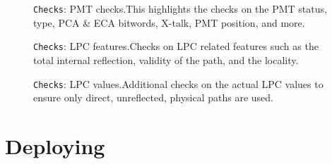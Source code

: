 \documentclass[12pt]{article}
\begin{document}
\begin{figure}
\centering
\noindent{}
  \caption{\centering \texttt{Checks}: PMT checks.\hspace{\textwidth}This highlights the checks on the PMT status, type, PCA \& ECA bitwords, X-talk, PMT position, and more.}
  \label{fig:ch2}
\end{figure}

\begin{figure}
\centering
\noindent{}
  \caption{\centering \texttt{Checks}: LPC features.\hspace{\textwidth}Checks on LPC related features such as the total internal reflection, validity of the path, and the locality.}
  \label{fig:ch4}
\end{figure}

\begin{figure}
\centering
\noindent{}
  \caption{\centering \texttt{Checks}: LPC values.\hspace{\textwidth}Additional checks on the actual LPC values to ensure only direct, unreflected, physical paths are used.}
  \label{fig:ch5}
\end{figure}

\clearpage

\section{Deploying}\label{sec:dep}
\end{document}
